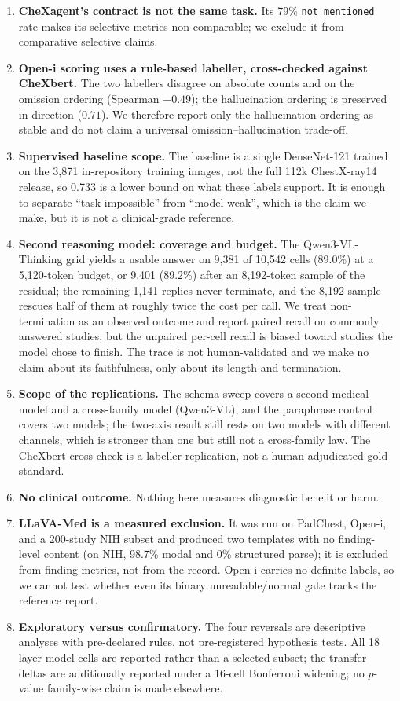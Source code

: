 \begin{enumerate}[leftmargin=1.2em,itemsep=2pt,topsep=2pt]
\item \textbf{CheXagent's contract is not the same task.} Its 79\% \texttt{not\_mentioned} rate makes its selective metrics non-comparable; we exclude it from comparative selective claims.
\item \textbf{Open-i scoring uses a rule-based labeller, cross-checked against CheXbert.} The two labellers disagree on absolute counts and on the omission ordering (Spearman $-0.49$); the hallucination ordering is preserved in direction ($0.71$). We therefore report only the hallucination ordering as stable and do not claim a universal omission--hallucination trade-off.
\item \textbf{Supervised baseline scope.} The baseline is a single DenseNet-121 trained on the 3,871 in-repository training images, not the full 112k ChestX-ray14 release, so 0.733 is a lower bound on what these labels support. It is enough to separate ``task impossible'' from ``model weak'', which is the claim we make, but it is not a clinical-grade reference.
\item \textbf{Second reasoning model: coverage and budget.} The Qwen3-VL-Thinking grid yields a usable answer on 9,381 of 10,542 cells (89.0\%) at a 5,120-token budget, or 9,401 (89.2\%) after an 8,192-token sample of the residual; the remaining 1,141 replies never terminate, and the 8,192 sample rescues half of them at roughly twice the cost per call. We treat non-termination as an observed outcome and report paired recall on commonly answered studies, but the unpaired per-cell recall is biased toward studies the model chose to finish. The trace is not human-validated and we make no claim about its faithfulness, only about its length and termination.
\item \textbf{Scope of the replications.} The schema sweep covers a second medical model and a cross-family model (Qwen3-VL), and the paraphrase control covers two models; the two-axis result still rests on two models with different channels, which is stronger than one but still not a cross-family law. The CheXbert cross-check is a labeller replication, not a human-adjudicated gold standard.
\item \textbf{No clinical outcome.} Nothing here measures diagnostic benefit or harm.
\item \textbf{LLaVA-Med is a measured exclusion.} It was run on PadChest, Open-i, and a 200-study NIH subset and produced two templates with no finding-level content (on NIH, 98.7\% modal and 0\% structured parse); it is excluded from finding metrics, not from the record. Open-i carries no definite labels, so we cannot test whether even its binary unreadable/normal gate tracks the reference report.
\item \textbf{Exploratory versus confirmatory.} The four reversals are descriptive analyses with pre-declared rules, not pre-registered hypothesis tests. All 18 layer-model cells are reported rather than a selected subset; the transfer deltas are additionally reported under a 16-cell Bonferroni widening; no $p$-value family-wise claim is made elsewhere.
\end{enumerate}
